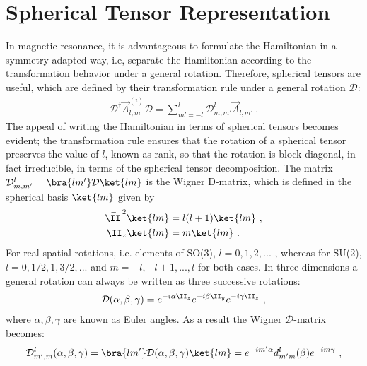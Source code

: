 \section{Spherical Tensor Representation}
\label{sec:spherical tensor}

In magnetic resonance, it is advantageous to formulate the Hamiltonian in a symmetry-adapted way, i.e, separate the Hamiltonian according to the transformation behavior under a general rotation. 
Therefore, spherical tensors are useful, which are defined by their transformation rule under a general rotation $\mathcal{D}$:
\begin{align}
   \mathcal{D}^{\dagger}  \vec{A}^{(i)}_{l,m}  \mathcal{D} = \sum^l_{m'=-l} \mathcal{D}^{l}_{m,m'}\vec{A}_{l,m'}~.
\end{align}
The appeal of writing the Hamiltonian in terms of spherical tensors becomes evident; the transformation rule ensures that the rotation of a spherical tensor preserves the value of $l$, known as rank, so that the rotation is block-diagonal, in fact irreducible, in terms of the spherical tensor decomposition.
The matrix $\mathcal{D}^{l}_{m,m'}= \bra{lm'} \mathcal{D}\ket{lm}$ is the Wigner D-matrix,
which is defined in the spherical basis $\ket{lm}$ given by
\begin{align}
  {\vec{\II}\,}^2 \ket{lm} &= l(l+1) \ket{lm}~,\\
  \II_z \ket{lm} &= m \ket{lm}~.
\end{align}
For real spatial rotations, i.e. elements of SO(3), $l = 0, 1, 2, ...$ , whereas for SU(2), $l = 0, 1/2, 1, 3/2, ...$ and $m = -l,-l+1 , ..., l$ for both cases.
In three dimensions a general rotation can always be written as three successive rotations:
\begin{align}
  \mathcal {D}(\alpha ,\beta ,\gamma )=e^{-i\alpha \II_{z}}e^{-i\beta \II_{y}}e^{-i\gamma \II_{z}}~,
\end{align}
where $\alpha, \beta, \gamma$ are known as Euler angles.
As a result the Wigner $\mathcal{D}$-matrix becomes:
\begin{align}
  \mathcal{D}^{l}_{m',m}(\alpha,\beta,\gamma) =
  \bra{lm'} \mathcal{D}(\alpha ,\beta ,\gamma )\ket{lm} =e^{-im'\alpha }d_{m'm}^{l}(\beta)e^{-im\gamma }~,
\end{align}
